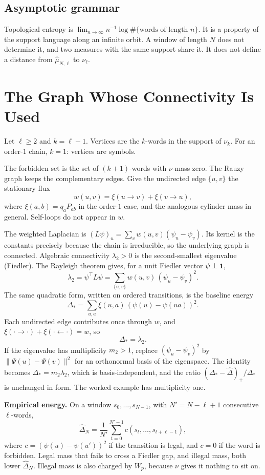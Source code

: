 \documentclass[11pt,reqno]{amsart}
\theoremstyle{remark}
\begin{document}
\subsection{Asymptotic grammar}

Topological entropy is $\lim_{n\to\infty} n^{-1} \log \#\{\text{words of length }n\}$. It is a property of the support language along an infinite orbit. A window of length $N$ does not determine it, and two measures with the same support share it. It does not define a distance from $\hat\mu_{N,\ell}$ to $\nu_\ell$.

\section{The Graph Whose Connectivity Is Used}\label{sec:graph}

Let $\ell \ge 2$ and $k = \ell - 1$. Vertices are the $k$-words in the support of $\nu_k$. For an order-$1$ chain, $k = 1$: vertices are symbols.

The forbidden set is the set of $(k+1)$-words with $\nu$-mass zero. The Rauzy graph keeps the complementary edges. Give the undirected edge $\{u,v\}$ the stationary flux
\[
w(u,v) = \xi(u \to v) + \xi(v \to u),
\]
where $\xi(a,b) = q_a P_{ab}$ in the order-$1$ case, and the analogous cylinder mass in general. Self-loops do not appear in $w$.

The weighted Laplacian is $(L\psi)_u = \sum_v w(u,v)(\psi_u - \psi_v)$. Its kernel is the constants precisely because the chain is irreducible, so the underlying graph is connected. Algebraic connectivity $\lambda_2 > 0$ is the second-smallest eigenvalue (Fiedler). The Rayleigh theorem gives, for a unit Fiedler vector $\psi \perp \mathbf{1}$,
\[
\lambda_2 = \psi^\top L \psi = \sum_{\{u,v\}} w(u,v)\,(\psi_u - \psi_v)^2.
\]
The same quadratic form, written on ordered transitions, is the baseline energy
\[
\Delta_* = \sum_{u,a} \xi(u,a)\,(\psi(u)-\psi(ua))^2.
\]
Each undirected edge contributes once through $w$, and $\xi(\cdot\to\cdot)+\xi(\cdot\leftarrow\cdot) = w$, so
\[
\Delta_* = \lambda_2.
\]
If the eigenvalue has multiplicity $m_2 > 1$, replace $(\psi_u-\psi_v)^2$ by $\|\Psi(u)-\Psi(v)\|^2$ for an orthonormal basis of the eigenspace. The identity becomes $\Delta_* = m_2 \lambda_2$, which is basis-independent, and the ratio $(\Delta_* - \hat\Delta)_+/\Delta_*$ is unchanged in form. The worked example has multiplicity one.

\medskip\noindent\textbf{Empirical energy.} On a window $s_0,\ldots,s_{N-1}$, with $N' = N-\ell+1$ consecutive $\ell$-words,
\[
\hat\Delta_N = \frac{1}{N'}\sum_{t=0}^{N'-1} c(s_t,\ldots,s_{t+\ell-1}),
\]
where $c = (\psi(u)-\psi(u'))^2$ if the transition is legal, and $c = 0$ if the word is forbidden. Legal mass that fails to cross a Fiedler gap, and illegal mass, both lower $\hat\Delta_N$. Illegal mass is also charged by $W_p$, because $\nu$ gives it nothing to sit on.
\end{document}
